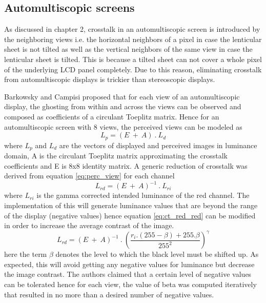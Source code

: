 \subsection{Automultiscopic screens}
As discussed in chapter 2, crosstalk in an automultiscopic screen is introduced by the neighboring views i.e. the horizontal neighbors of a pixel in case the lenticular sheet is not tilted as well as the vertical neighbors of the same view in case the lenticular sheet is tilted. This is because a tilted sheet can not cover a whole pixel of the underlying LCD panel completely. Due to this reason, eliminating crosstalk from automultiscopic displays is trickier than stereoscopic displays.

Barkowsky and Campisi \cite{barkowsky2010crosstalk} proposed that for each view of an automultiscopic display, the ghosting from within and across the views can be observed and composed as coefficients of a circulant Toeplitz matrix. Hence for an automultiscopic screen with 8 views, the perceived views can be modeled as
\begin{equation}
L_p = (E\:+\:A)\:.\:L_d
\label{eq:perc_view}
\end{equation}
where $L_p$ and $L_d$ are the vectors of displayed and perceived images in luminance domain, A is the circulant Toeplitz matrix approximating the crosstalk coefficients and E is 8x8 identity matrix. A generic reduction of crosstalk was derived from equation \ref{eq:perc_view} for each channel
\begin{equation}
L_{rd} = (E\:+\:A)^{-1}\:.\:L_{ri}
\label{eq:ct_red_red}
\end{equation}
where $L_{ri}$ is the gamma corrected intended luminance of the red channel. The implementation of this will generate luminance values that are beyond the range of the display (negative values) hence equation \ref{eq:ct_red_red} can be modified in order to increase the average contrast of the image.
\begin{equation}
L_{rd} = (E\:+\:A)^{-1}\:.\:\left(\frac{r_i.(255-\beta)+255.\beta}{255^2}\right)^{\gamma}
\label{eq:ct_red_reduced_contrast}
\end{equation}
here the term $\beta$ denotes the level to which the black level must be shifted up. As expected, this will avoid getting any negative values for luminance but decrease the image contrast. The authors claimed that a certain level of negative values can be tolerated hence for each view, the value of beta was computed iteratively that resulted in no more than a desired number of negative values.


